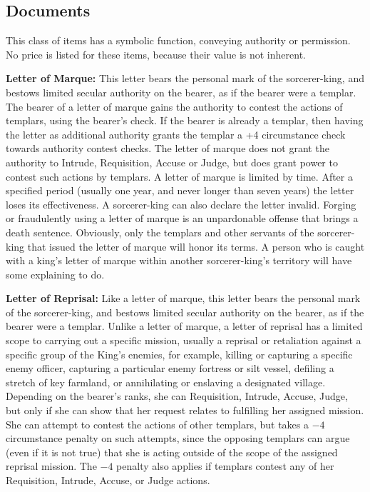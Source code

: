 \subsection{Documents}
This class of items has a symbolic function, conveying authority or permission. No price is listed for these items, because their value is not inherent.

\textbf{Letter of Marque:} This letter bears the personal mark of the sorcerer-king, and bestows limited secular authority on the bearer, as if the bearer were a templar. The bearer of a letter of marque gains the authority to contest the actions of templars, using the bearer's  check. If the bearer is already a templar, then having the letter as additional authority grants the templar a +4 circumstance check towards authority contest checks. The letter of marque does not grant the authority to Intrude, Requisition, Accuse or Judge, but does grant power to contest such actions by templars. A letter of marque is limited by time. After a specified period (usually one year, and never longer than seven years) the letter loses its effectiveness. A sorcerer-king can also declare the letter invalid. Forging or fraudulently using a letter of marque is an unpardonable offense that brings a death sentence. Obviously, only the templars and other servants of the sorcerer-king that issued the letter of marque will honor its terms. A person who is caught with a king's letter of marque within another sorcerer-king's territory will have some explaining to do.

\textbf{Letter of Reprisal:} Like a letter of marque, this letter bears the personal mark of the sorcerer-king, and bestows limited secular authority on the bearer, as if the bearer were a templar. Unlike a letter of marque, a letter of reprisal has a limited scope to carrying out a specific mission, usually a reprisal or retaliation against a specific group of the King's enemies, for example, killing or capturing a specific enemy officer, capturing a particular enemy fortress or silt vessel, defiling a stretch of key farmland, or annihilating or enslaving a designated village. Depending on the bearer's  ranks, she can Requisition, Intrude, Accuse, Judge, but only if she can show that her request relates to fulfilling her assigned mission. She can attempt to contest the actions of other templars, but takes a $-4$ circumstance penalty on such attempts, since the opposing templars can argue (even if it is not true) that she is acting outside of the scope of the assigned reprisal mission. The $-4$ penalty also applies if templars contest any of her Requisition, Intrude, Accuse, or Judge actions.